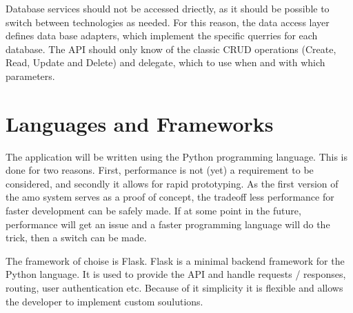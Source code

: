 Database services should not be accessed driectly, as it should be possible to switch between technologies as needed. For this
reason, the data access layer defines data base adapters, which implement the specific querries for each database. The API should
only know of the classic CRUD operations (Create, Read, Update and Delete) and delegate, which to use when and with which
parameters.

\section{Languages and Frameworks}
The application will be written using the Python programming language. This is done for two reasons. First, performance is not
(yet) a requirement to be considered, and secondly it allows for rapid prototyping. As the first version of the amo system serves
as a proof of concept, the tradeoff {\glqq less performance for faster development\grqq} can be safely made. If at some point in
the future, performance will get an issue and a faster programming language will do the trick, then a switch can be made.

The framework of choise is Flask. Flask is a minimal backend framework for the Python language. It is used to provide the API
and handle requests / responses, routing, user authentication etc. Because of it simplicity it is flexible and allows the
developer to implement custom soulutions.
